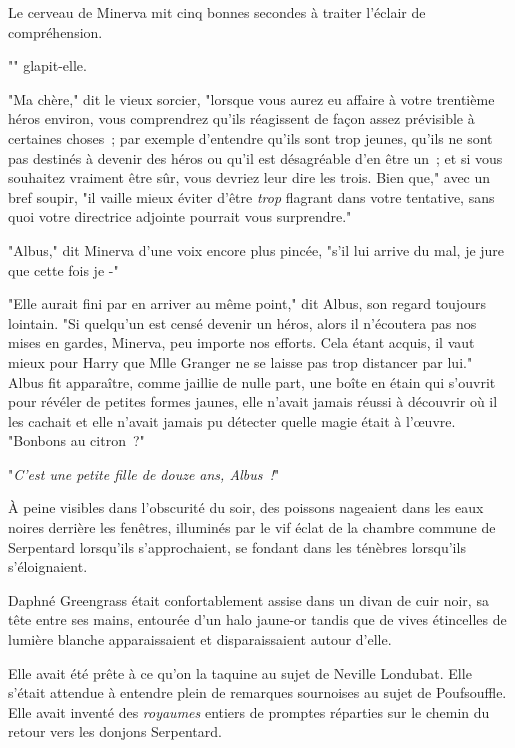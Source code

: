 Le cerveau de Minerva mit cinq bonnes secondes à traiter l'éclair de compréhension.

"" glapit-elle.

"Ma chère," dit le vieux sorcier, "lorsque vous aurez eu affaire à votre trentième héros environ, vous comprendrez qu'ils réagissent de façon assez prévisible à certaines choses~; par exemple d'entendre qu'ils sont trop jeunes, qu'ils ne sont pas destinés à devenir des héros ou qu'il est désagréable d'en être un~; et si vous souhaitez vraiment être sûr, vous devriez leur dire les trois. Bien que," avec un bref soupir, "il vaille mieux éviter d'être \emph{trop} flagrant dans votre tentative, sans quoi votre directrice adjointe pourrait vous surprendre."

"Albus," dit Minerva d'une voix encore plus pincée, "s'il lui arrive du mal, je jure que cette fois je -"

"Elle aurait fini par en arriver au même point," dit Albus, son regard toujours lointain. "Si quelqu'un est censé devenir un héros, alors il n'écoutera pas nos mises en gardes, Minerva, peu importe nos efforts. Cela étant acquis, il vaut mieux pour Harry que Mlle Granger ne se laisse pas trop distancer par lui." Albus fit apparaître, comme jaillie de nulle part, une boîte en étain qui s'ouvrit pour révéler de petites formes jaunes, elle n'avait jamais réussi à découvrir où il les cachait et elle n'avait jamais pu détecter quelle magie était à l'œuvre. "Bonbons au citron~?"

"\emph{C'est une petite fille de douze ans, Albus~!}"


À peine visibles dans l'obscurité du soir, des poissons nageaient dans les eaux noires derrière les fenêtres, illuminés par le vif éclat de la chambre commune de Serpentard lorsqu'ils s'approchaient, se fondant dans les ténèbres lorsqu'ils s'éloignaient.

Daphné Greengrass était confortablement assise dans un divan de cuir noir, sa tête entre ses mains, entourée d'un halo jaune-or tandis que de vives étincelles de lumière blanche apparaissaient et disparaissaient autour d'elle.

Elle avait été prête à ce qu'on la taquine au sujet de Neville Londubat. Elle s'était attendue à entendre plein de remarques sournoises au sujet de Poufsouffle. Elle avait inventé des \emph{royaumes} entiers de promptes réparties sur le chemin du retour vers les donjons Serpentard.

